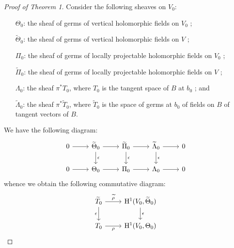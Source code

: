 \documentclass{article}
\newcommand{\HH}{\mathrm{H}}
\newcommand{\oldpage}[1]{\marginpar{\footnotesize$\Big\vert$ \textit{p.~#1}}}
\begin{document}
\begin{proof}[Proof of Theorem 1]
  Consider the following sheaves on $V_0$:
  \begin{itemize}
    \item[$\Theta_0$:] the sheaf of germs of vertical holomorphic fields on $V_0$ ;
    \item[$\widetilde{\Theta}_0$:] the sheaf of germs of vertical holomorphic fields on $V$ ;
    \item[$\Pi_0$:] the sheaf of germs of locally projectable holomorphic fields on $V_0$ ;
    \item[$\widetilde{\Pi}_0$:] the sheaf of germs of locally projectable holomorphic fields on $V$ ;
    \item[$\Lambda_0$:] the sheaf $\pi^*T_0$, where $T_0$ is the tangent space of $B$ at $b_0$ ; and
    \item[$\widetilde{\Lambda}_0$:] the sheaf $\pi^*\widetilde{T}_0$, where $\widetilde{T}_0$ is the space of germs at $b_0$ of fields on $B$ of tangent vectors of $B$.
  \end{itemize}

  We have the following diagram:
  \[
    \begin{tikzcd}
      0 \rar
      & \widetilde{\Theta}_0 \rar \dar["\epsilon"]
      & \widetilde{\Pi}_0 \rar \dar["\epsilon"]
      & \widetilde{\Lambda}_0 \rar \dar["\epsilon"]
      & 0
    \\0 \rar
      & \Theta_0 \rar
      & \Pi_0 \rar
      & \Lambda_0 \rar
      & 0
    \end{tikzcd}
  \]
\oldpage{4-04}
  whence we obtain the following commutative diagram:
  \[
    \begin{tikzcd}
      \widetilde{T}_0 \rar["\widetilde{\rho}"] \dar[swap,"\epsilon"]
      & \HH^1(V_0,\widetilde{\Theta}_0) \dar["\epsilon"]
    \\T_0 \rar[swap,"\rho"]
      & \HH^1(V_0,\Theta_0)
    \end{tikzcd}
  \]


\end{proof}
\end{document}
